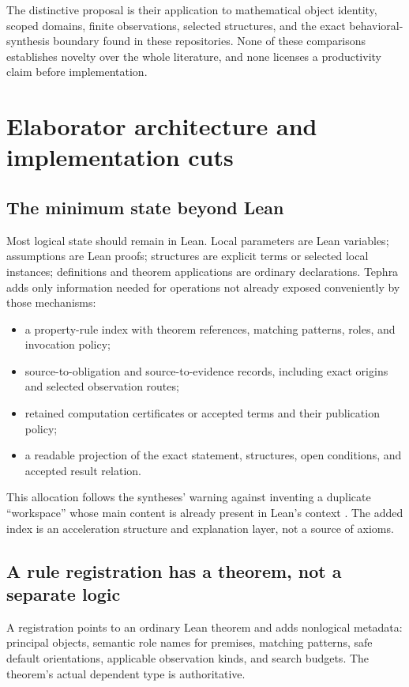 \documentclass[11pt,a4paper]{article}
\theoremstyle{plain}
\theoremstyle{definition}
\begin{document}
The distinctive proposal is their application to mathematical object identity, scoped domains, finite observations, selected structures, and the exact behavioral-synthesis boundary found in these repositories. None of these comparisons establishes novelty over the whole literature, and none licenses a productivity claim before implementation.

\section{Elaborator architecture and implementation cuts}\label{sec:implementation}

\subsection{The minimum state beyond Lean}
Most logical state should remain in Lean. Local parameters are Lean variables; assumptions are Lean proofs; structures are explicit terms or selected local instances; definitions and theorem applications are ordinary declarations. Tephra adds only information needed for operations not already exposed conveniently by those mechanisms:
\begin{itemize}
\item a property-rule index with theorem references, matching patterns, roles, and invocation policy;
\item source-to-obligation and source-to-evidence records, including exact origins and selected observation routes;
\item retained computation certificates or accepted terms and their publication policy;
\item a readable projection of the exact statement, structures, open conditions, and accepted result relation.
\end{itemize}
This allocation follows the syntheses' warning against inventing a duplicate ``workspace'' whose main content is already present in Lean's context \cite{synA,synB}. The added index is an acceleration structure and explanation layer, not a source of axioms.

\subsection{A rule registration has a theorem, not a separate logic}
A registration points to an ordinary Lean theorem and adds nonlogical metadata: principal objects, semantic role names for premises, matching patterns, safe default orientations, applicable observation kinds, and search budgets. The theorem's actual dependent type is authoritative.
\end{document}

